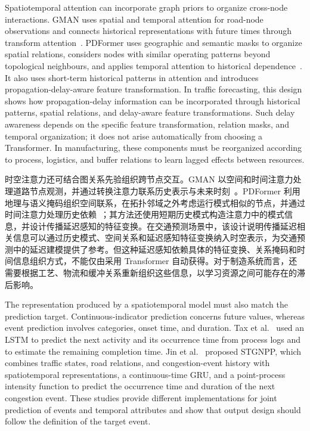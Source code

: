 \documentclass[a4paper,fleqn]{cas-dc}
\newcommand{\zhpara}[1]{%
  \par\begingroup\small\color{black!72}\noindent #1\par\endgroup}
\begin{document}
Spatiotemporal attention can incorporate graph priors to organize cross-node interactions. GMAN uses spatial and temporal attention for road-node observations and connects historical representations with future times through transform attention~\cite{zheng2020gman}. PDFormer uses geographic and semantic masks to organize spatial relations, considers nodes with similar operating patterns beyond topological neighbours, and applies temporal attention to historical dependence~\cite{jiang2023pdformer}. It also uses short-term historical patterns in attention and introduces propagation-delay-aware feature transformation. In traffic forecasting, this design shows how propagation-delay information can be incorporated through historical patterns, spatial relations, and delay-aware feature transformations. Such delay awareness depends on the specific feature transformation, relation masks, and temporal organization; it does not arise automatically from choosing a Transformer. In manufacturing, these components must be reorganized according to process, logistics, and buffer relations to learn lagged effects between resources.

\zhpara{时空注意力还可结合图关系先验组织跨节点交互。GMAN 以空间和时间注意力处理道路节点观测，并通过转换注意力联系历史表示与未来时刻~\cite{zheng2020gman}。PDFormer 利用地理与语义掩码组织空间联系，在拓扑邻域之外考虑运行模式相似的节点，并通过时间注意力处理历史依赖~\cite{jiang2023pdformer}；其方法还使用短期历史模式构造注意力中的模式信息，并设计传播延迟感知的特征变换。在交通预测场景中，该设计说明传播延迟相关信息可以通过历史模式、空间关系和延迟感知特征变换纳入时空表示，为交通预测中的延迟建模提供了参考。但这种延迟感知依赖具体的特征变换、关系掩码和时间信息组织方式，不能仅由采用 Transformer 自动获得。对于制造系统而言，还需要根据工艺、物流和缓冲关系重新组织这些信息，以学习资源之间可能存在的滞后影响。}

The representation produced by a spatiotemporal model must also match the prediction target. Continuous-indicator prediction concerns future values, whereas event prediction involves categories, onset time, and duration. Tax et al.~\cite{tax2017predictive} used an LSTM to predict the next activity and its occurrence time from process logs and to estimate the remaining completion time. Jin et al.~\cite{jin2023stgnpp} proposed STGNPP, which combines traffic states, road relations, and congestion-event history with spatiotemporal representations, a continuous-time GRU, and a point-process intensity function to predict the occurrence time and duration of the next congestion event. These studies provide different implementations for joint prediction of events and temporal attributes and show that output design should follow the definition of the target event.
\end{document}
